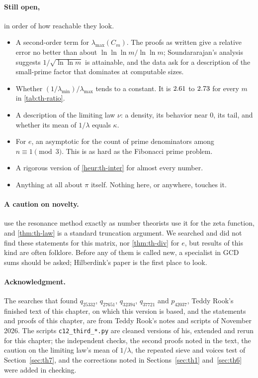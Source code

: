 \paragraph{Still open,} in order of how reachable they look.
\begin{itemize}
\item A second-order term for $\lambda_{\max}(C_m)$. The proofs as written give a relative error no better than about $\ln\ln\ln m/\ln\ln m$; Soundararajan's analysis suggests $1/\sqrt{\ln\ln m}$ is attainable, and the data ask for a description of the small-prime factor that dominates at computable sizes.
\item Whether $(1/\lambda_{\min})/\lambda_{\max}$ tends to a constant. It is $2.61$ to $2.73$ for every $m$ in \cref{tab:th-ratio}.
\item A description of the limiting law $\nu$: a density, its behavior near 0, its tail, and whether its mean of $1/\lambda$ equals $\kappa$.
\item For $e$, an asymptotic for the count of prime denominators among $n \equiv 1 \pmod 3$. This is as hard as the Fibonacci prime problem.
\item A rigorous version of \cref{heur:th-inter} for almost every number.
\item Anything at all about $\pi$ itself. Nothing here, or anywhere, touches it.
\end{itemize}

\paragraph{A caution on novelty.}  use the resonance method exactly as number theorists use it for the zeta function, and \cref{thm:th-law} is a standard truncation argument. We searched and did not find these statements for this matrix, nor \cref{thm:th-div} for $e$, but results of this kind are often folklore. Before any of them is called new, a specialist in GCD sums should be asked; Hilberdink's paper \citep{Hilberdink2009} is the first place to look.

\paragraph{Acknowledgment.} The searches that found $q_{25332}$, $q_{27651}$, $q_{32394}$, $q_{37721}$ and $p_{42037}$, Teddy Rook's finished text of this chapter, on which this version is based, and the statements and proofs of this chapter, are from Teddy Rook's notes and scripts of November 2026. The scripts \texttt{c12\_third\_*.py} are cleaned versions of his, extended and rerun for this chapter; the independent checks, the second proofs noted in the text, the caution on the limiting law's mean of $1/\lambda$, the repeated sieve and voices test of Section~\ref{sec:th7}, and the corrections noted in Sections~\ref{sec:th1} and~\ref{sec:th6} were added in checking.
